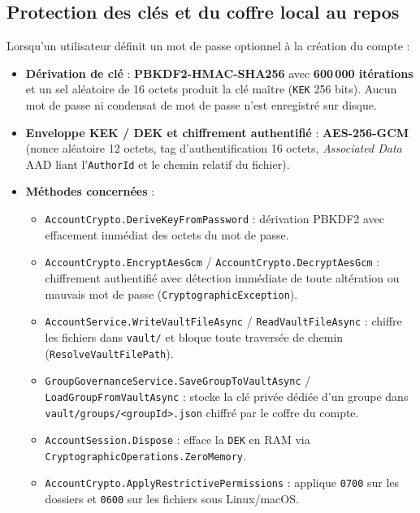 \documentclass[11pt,a4paper]{article}
\begin{document}
\subsection{Protection des clés et du coffre local au repos}
Lorsqu'un utilisateur définit un mot de passe optionnel à la création du compte :
\begin{itemize}
    \item \textbf{Dérivation de clé} : \textbf{PBKDF2-HMAC-SHA256} avec \textbf{600\,000 itérations} et un sel aléatoire de 16 octets produit la clé maître (\texttt{KEK} 256 bits). Aucun mot de passe ni condensat de mot de passe n'est enregistré sur disque.
    \item \textbf{Enveloppe KEK / DEK et chiffrement authentifié} : \textbf{AES-256-GCM} (nonce aléatoire 12 octets, tag d'authentification 16 octets, \emph{Associated Data} AAD liant l'\texttt{AuthorId} et le chemin relatif du fichier).
    \item \textbf{Méthodes concernées} :
    \begin{itemize}
        \item \texttt{AccountCrypto.DeriveKeyFromPassword} : dérivation PBKDF2 avec effacement immédiat des octets du mot de passe.
        \item \texttt{AccountCrypto.EncryptAesGcm} / \texttt{AccountCrypto.DecryptAesGcm} : chiffrement authentifié avec détection immédiate de toute altération ou mauvais mot de passe (\texttt{CryptographicException}).
        \item \texttt{AccountService.WriteVaultFileAsync} / \texttt{ReadVaultFileAsync} : chiffre les fichiers dans \texttt{vault/} et bloque toute traversée de chemin (\texttt{ResolveVaultFilePath}).
        \item \texttt{GroupGovernanceService.SaveGroupToVaultAsync} / \texttt{LoadGroupFromVaultAsync} : stocke la clé privée dédiée d'un groupe dans \texttt{vault/groups/<groupId>.json} chiffré par le coffre du compte.
        \item \texttt{AccountSession.Dispose} : efface la \texttt{DEK} en RAM via \texttt{CryptographicOperations.ZeroMemory}.
        \item \texttt{AccountCrypto.ApplyRestrictivePermissions} : applique \texttt{0700} sur les dossiers et \texttt{0600} sur les fichiers sous Linux/macOS.
    \end{itemize}
\end{itemize}
\end{document}
